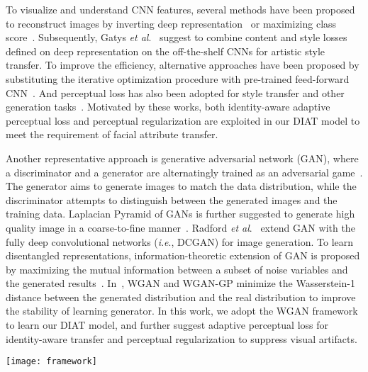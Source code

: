 \documentclass[journal]{IEEEtran}
\newcommand{\etal}{\textit{et al}.}
\newcommand{\ie}{\textit{i}.\textit{e}.}
\begin{document}
To visualize and understand CNN features, several methods have been proposed to reconstruct images by inverting deep representation~\cite{mahendran2015understanding} or maximizing class score~\cite{simonyan2013deep}.
Subsequently, Gatys \etal~\cite{gatys2015style} suggest to combine content and style losses defined on deep representation on the off-the-shelf CNNs for artistic style transfer.
To improve the efficiency, alternative approaches have been proposed by substituting the iterative optimization procedure with pre-trained feed-forward CNN~\cite{johnson2016perceptual, ulyanov2016texture}.
And perceptual loss has also been adopted for style transfer and other generation tasks~\cite{johnson2016perceptual}.
Motivated by these works, both identity-aware adaptive perceptual loss and perceptual regularization are exploited in our DIAT model to meet the requirement of facial attribute transfer.


Another representative approach is generative adversarial network (GAN), where a discriminator and a generator are alternatingly trained as an adversarial game~\cite{goodfellow2014generative}.
The generator aims to generate images to match the data distribution, while the discriminator attempts to distinguish between the generated images and the training data.
Laplacian Pyramid of GANs is further suggested to generate high quality image in a coarse-to-fine manner~\cite{denton2015deep}.
Radford \etal~\cite{radford2015unsupervised} extend GAN with the fully deep convolutional networks (\ie, DCGAN) for image generation.
To learn disentangled representations, information-theoretic extension of GAN is proposed by maximizing the mutual information between a subset of noise variables and the generated results~\cite{chen2016infogan}.
In~\cite{arjovsky2017wasserstein,gulrajani2017improved}, WGAN and WGAN-GP minimize the Wasserstein-1 distance between the generated distribution and the real distribution to improve the stability of learning generator.
In this work, we adopt the WGAN framework to learn our DIAT model, and further suggest adaptive perceptual loss for identity-aware transfer and perceptual regularization to suppress visual artifacts.
\begin{figure*}[t]
\begin{center}
   \texttt{[image: framework]}
\end{center}
   \caption{Schematic illustration of our DIAT model. Here we use \emph{glasses removal} as an example. The whole attribute transfer network  includes two sub-networks, \ie, a mask network to find the attribute relevant region  and an attribute transform network to produce the transformed image . Then  and  collaborate to generate the transfer result . In order to learn  from training data, we incorporate adversarial attribute loss , identity loss , adaptive perceptual loss  with perceptual regularization . Besides, an attribute ratio regularization is also adopted to constrain the estimated mask .}
\label{diat_procedure}
\end{figure*}
\end{document}
